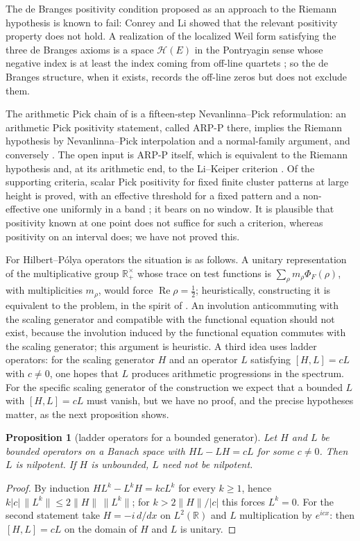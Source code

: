 \documentclass[11pt]{amsart}
\newtheorem{proposition}[theorem]{Proposition}
\theoremstyle{definition}
\theoremstyle{remark}
\numberwithin{equation}{section}
\newcommand{\R}{\mathbb{R}}
\DeclareMathOperator{\Rel}{Re}
\newcommand{\PhiF}{\Phi_F}                             %
\begin{document}
The de Branges positivity condition proposed as an approach to the Riemann hypothesis is known to
fail: Conrey and Li \cite{ConreyLi2000} showed that the relevant positivity property does not hold.
A realization of the localized Weil form satisfying the three de Branges axioms is a space
$\mathcal H(E)$ in the Pontryagin sense whose negative index is at least the index coming from
off-line quartets \cite[Theorem~8.4]{P18}; so the de Branges structure, when it exists, records the
off-line zeros but does not exclude them.

The arithmetic Pick chain of \cite{P36} is a fifteen-step Nevanlinna--Pick reformulation: an
arithmetic Pick positivity statement, called ARP-P there, implies the Riemann hypothesis by
Nevanlinna--Pick interpolation and a normal-family argument, and conversely
\cite[Theorems~9.241 and 9.245, Corollary~9.246]{P36}. The open input is ARP-P itself, which is
equivalent to the Riemann hypothesis and, at its arithmetic end, to the Li--Keiper criterion
\cite[Corollary~9.247]{P36}. Of the supporting criteria, scalar Pick positivity for fixed finite
cluster patterns at large height is proved, with an effective threshold for a fixed pattern
\cite[Theorem~9.43]{P36} and a non-effective one uniformly in a band \cite[Theorem~9.64]{P36}; it
bears on no window. It is plausible that positivity known at one point does not suffice for such a
criterion, whereas positivity on an interval does; we have not proved this.

For Hilbert--P\'olya operators the situation is as follows. A unitary representation of the
multiplicative group $\R_+^\times$ whose trace on test functions is $\sum_\rho m_\rho\PhiF(\rho)$,
with multiplicities $m_\rho$, would force $\Rel\rho=\frac12$; heuristically, constructing it is
equivalent to the problem, in the spirit of \cite{Connes1999}. An involution anticommuting with
the scaling generator and compatible with the functional equation should not exist, because the
involution induced by the functional equation commutes with the scaling generator; this argument
is heuristic. A third idea uses ladder operators: for the scaling generator $H$ and an operator
$L$ satisfying $[H,L]=cL$ with $c\ne0$, one hopes that $L$ produces arithmetic progressions in the
spectrum. For the specific scaling generator of the construction we expect that a bounded $L$ with
$[H,L]=cL$ must vanish, but we have no proof, and the precise hypotheses matter, as the next
proposition shows.

\begin{proposition}[ladder operators for a bounded generator]\label{w6:prop:ladder}
Let $H$ and $L$ be bounded operators on a Banach space with $HL-LH=cL$ for some $c\neq0$. Then $L$ is
nilpotent. If $H$ is unbounded, $L$ need not be nilpotent.
\end{proposition}
\begin{proof}
By induction $HL^k-L^kH=kcL^k$ for every $k\ge1$, hence $k|c|\,\|L^k\|\le2\|H\|\,\|L^k\|$; for
$k>2\|H\|/|c|$ this forces $L^k=0$. For the second statement take $H=-i\,d/dx$ on $L^2(\R)$ and $L$
multiplication by $e^{icx}$: then $[H,L]=cL$ on the domain of $H$ and $L$ is unitary.
\end{proof}
\end{document}

